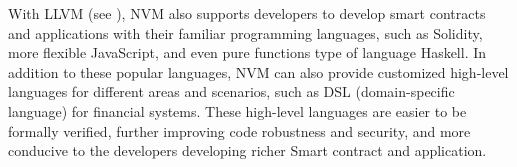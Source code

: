 With LLVM (see ), NVM also supports developers to develop
smart contracts and applications with their familiar programming languages,
such as Solidity, more flexible JavaScript, and even pure functions type of
language Haskell. In addition to these popular languages, NVM can also provide
customized high-level languages for different areas and scenarios, such as DSL
(domain-specific language) for financial systems. These high-level languages
are easier to be formally verified, further improving code robustness and
security, and more conducive to the developers developing richer Smart contract
and application.

